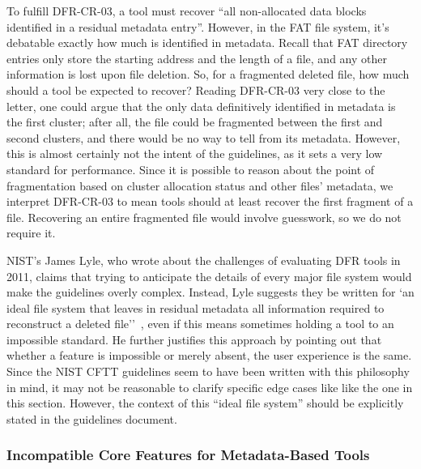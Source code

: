 To fulfill DFR-CR-03, a tool must recover ``all non-allocated data blocks identified in a residual metadata entry''\cite{meta:dfr:standards}.
However, in the FAT file system, it's debatable exactly how much is identified in metadata.
Recall that FAT directory entries only store the starting address and the length of a file, and any other information is lost upon file deletion.
So, for a fragmented deleted file, how much should a tool be expected to recover?
Reading DFR-CR-03 very close to the letter, one could argue that the only data definitively identified in metadata is the first cluster; after all, the file could be fragmented between the first and second clusters, and there would be no way to tell from its metadata.
However, this is almost certainly not the intent of the guidelines, as it sets a very low standard for performance.
Since it is possible to reason about the point of fragmentation based on cluster allocation status and other files' metadata, we interpret DFR-CR-03 to mean tools should at least recover the first fragment of a file.
Recovering an entire fragmented file would involve guesswork, so we do not require it.

NIST's James Lyle, who wrote about the challenges of evaluating DFR tools in 2011, 
claims that trying to anticipate the details of every major file system would make the guidelines overly complex. 
Instead, Lyle suggests they be written for `an ideal file system that leaves in 
residual metadata  all  information  required  to  reconstruct  a  deleted  file''~\cite{lyle2011-ICDF2C}, even if this means sometimes holding a tool to an impossible standard.
He further justifies this approach by pointing out that whether a feature is impossible or merely absent, the user experience is the same.
Since the NIST CFTT guidelines seem to have been written with this philosophy in mind, it may not be reasonable to clarify specific edge cases like like the one in this section.
However, the context of this ``ideal file system'' should be explicitly stated in the guidelines document.

\subsubsection{Incompatible Core Features for Metadata-Based Tools}

